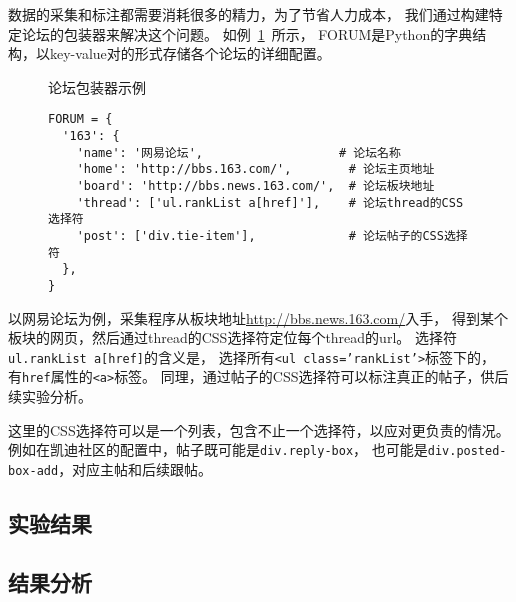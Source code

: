 数据的采集和标注都需要消耗很多的精力，为了节省人力成本，
我们通过构建特定论坛的包装器来解决这个问题。
如例~\ref{ex:forum-wrapper}~所示，
FORUM是Python的字典结构，以key-value对的形式存储各个论坛的详细配置。

\begin{figure}[htbp]
\begin{example}
\label{ex:forum-wrapper}
论坛包装器示例
\end{example}
\begin{verbatim}
FORUM = {
  '163': {
    'name': '网易论坛',                   # 论坛名称
    'home': 'http://bbs.163.com/',        # 论坛主页地址
    'board': 'http://bbs.news.163.com/',  # 论坛板块地址
    'thread': ['ul.rankList a[href]'],    # 论坛thread的CSS选择符 
    'post': ['div.tie-item'],             # 论坛帖子的CSS选择符
  },
}
\end{verbatim}
\end{figure}

以网易论坛为例，采集程序从板块地址\url{http://bbs.news.163.com/}入手，
得到某个板块的网页，然后通过thread的CSS选择符定位每个thread的url。
选择符\texttt{ul.rankList a[href]}的含义是，
选择所有\texttt{<ul class='rankList'>}标签下的，
有\texttt{href}属性的\texttt{<a>}标签。
同理，通过帖子的CSS选择符可以标注真正的帖子，供后续实验分析。

这里的CSS选择符可以是一个列表，包含不止一个选择符，以应对更负责的情况。
例如在凯迪社区的配置中，帖子既可能是\texttt{div.reply-box}，
也可能是\texttt{div.posted-box-add}，对应主帖和后续跟帖。

\subsection{实验结果}

\subsection{结果分析}
